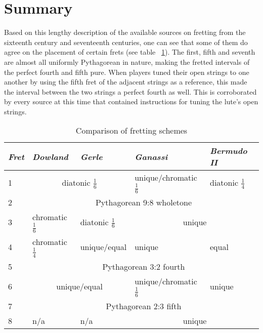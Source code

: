 \section{Summary}
Based on this lengthy description of the available sources on fretting from the sixteenth
century and seventeenth centuries, one can see that some of them do agree on the placement of certain
frets (see table ~\ref{table:comparison}). The first, fifth and seventh are  almost all
uniformly Pythagorean in nature, making the fretted intervals of the perfect fourth and
fifth pure. When players tuned their open strings to one another by using the fifth
fret of the adjacent strings as a reference, this made the interval between the
two strings a perfect fourth as well.  This is corroborated by every source at this
time that contained instructions for tuning the lute's open strings.

\begin{table}[h!]
  \begin{center}
    \begin{tabular}{ l l l l l }
      \textit{Fret} & \textit{Dowland} & \textit{Gerle} & \textit{Ganassi} & \textit{Bermudo II} \\
      \hline
      1 & \multicolumn{2}{|c|}{\cellcolor[gray]{0.9}diatonic $ \frac{1}{6} $} & unique/chromatic $ \frac{1}{6} $ & \cellcolor[gray]{0.9}diatonic $ \frac{1}{4} $ \\
      2 & \multicolumn{4}{|c|}{\cellcolor[gray]{0.9}Pythagorean 9:8 wholetone} \\
      3 & chromatic $ \frac{1}{6} $ & diatonic $ \frac{1}{6} $ & \multicolumn{2}{|c|}{\cellcolor[gray]{0.9}unique} \\
      4 & chromatic $ \frac{1}{4} $ & unique/equal & unique & equal \\
      5 & \multicolumn{4}{|c|}{\cellcolor[gray]{0.9}Pythagorean 3:2 fourth} \\
      6 & \multicolumn{2}{|c|}{\cellcolor[gray]{0.9} unique/equal } & unique/chromatic $ \frac{1}{6} $ & unique \\
      7 & \multicolumn{4}{|c|}{\cellcolor[gray]{0.9}Pythagorean 2:3 fifth} \\
      8 & n/a & n/a & \multicolumn{2}{|c|}{\cellcolor[gray]{0.9}unique} \\
    \end{tabular}
  \end{center}
  \caption{Comparison of fretting schemes}
  \label{table:comparison}
\end{table}

